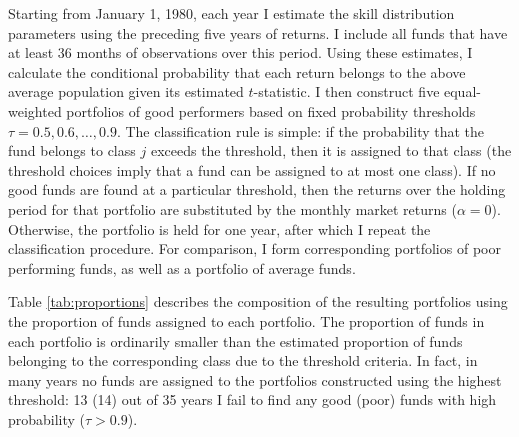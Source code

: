 		Starting from January 1, 1980, each year I estimate the skill distribution parameters using the preceding five years of returns. I include all funds that have at least 36 months of observations over this period. Using these estimates, I calculate the conditional probability that each return belongs to the above average population given its estimated $t$-statistic. I then construct five equal-weighted portfolios of good performers based on fixed probability thresholds $\tau = 0.5, 0.6, \dots, 0.9$. The classification rule is simple: if the probability that the fund belongs to class $j$ exceeds the threshold, then it is assigned to that class (the threshold choices imply that a fund can be assigned to at most one class). If no good funds are found at a particular threshold, then the returns over the holding period for that portfolio are substituted by the monthly market returns ($\alpha = 0$). Otherwise, the portfolio is held for one year, after which I repeat the classification procedure.  For comparison, I form corresponding portfolios of poor performing funds, as well as a portfolio of average funds.

		Table \ref{tab:proportions} describes the composition of the resulting portfolios using the proportion of funds assigned to each portfolio.  The proportion of funds in each portfolio is ordinarily smaller than the estimated proportion of funds belonging to the corresponding class due to the threshold criteria.  In fact, in many years no funds are assigned to the portfolios constructed using the highest threshold: 13 (14) out of 35 years I fail to find any good (poor) funds with high probability ($\tau > 0.9$).

